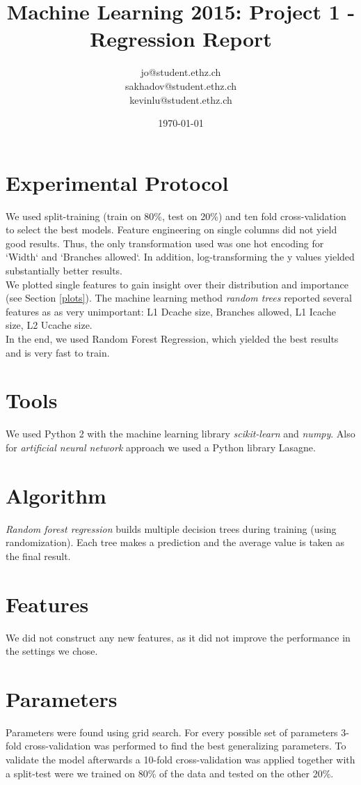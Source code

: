 \documentclass[a4paper, 11pt]{article}
\title{Machine Learning 2015: Project 1 - Regression Report}
\author{jo@student.ethz.ch\\ sakhadov@student.ethz.ch\\ kevinlu@student.ethz.ch\\}
\date{\today}
\begin{document}
\maketitle

\section*{Experimental Protocol}
We used split-training (train on 80\%, test on 20\%) and ten fold cross-validation to select the best models.
Feature engineering on single columns did not yield good results.
Thus, the only transformation used was one hot encoding for `Width` and `Branches allowed`. In addition, log-transforming the y values yielded substantially better results.\\
We plotted single features to gain insight over their distribution and importance (see Section \ref{plots}).
The machine learning method \textit{random trees} reported several features as as very unimportant: L1 Dcache size, Branches allowed, L1 Icache size, L2 Ucache size.\\
In the end, we used Random Forest Regression, which yielded the best results and is very fast to train.

\section{Tools}
We used Python 2 with the machine learning library \textit{scikit-learn} and \textit{numpy}. Also for \textit{artificial neural network} approach we used a Python library Lasagne.

\section{Algorithm}
\textit{Random forest regression} builds multiple decision trees during training (using randomization). Each tree makes a prediction and the average value is taken as the final result.

\section{Features}
We did not construct any new features, as it did not improve the performance in the settings we chose.

\section{Parameters}
Parameters were found using grid search. For every possible set of parameters 3-fold cross-validation was performed to find the best generalizing parameters. To validate the model afterwards a 10-fold cross-validation was applied together with a split-test were we trained on 80\% of the data and tested on the other 20\%.
\end{document}
